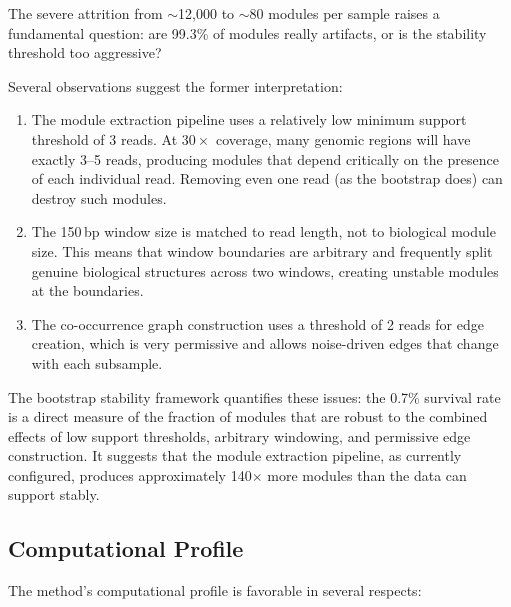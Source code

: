 \documentclass{../yalumba}
\begin{document}
The severe attrition from $\sim$12{,}000 to $\sim$80 modules per sample raises
a fundamental question: are 99.3\% of modules really artifacts, or is the
stability threshold too aggressive?

Several observations suggest the former interpretation:

\begin{enumerate}
  \item The module extraction pipeline uses a relatively low minimum support
    threshold of 3 reads.  At $30\times$ coverage, many genomic regions will
    have exactly 3--5 reads, producing modules that depend critically on the
    presence of each individual read.  Removing even one read (as the bootstrap
    does) can destroy such modules.
  \item The 150\,bp window size is matched to read length, not to biological
    module size.  This means that window boundaries are arbitrary and
    frequently split genuine biological structures across two windows, creating
    unstable modules at the boundaries.
  \item The co-occurrence graph construction uses a threshold of 2 reads for
    edge creation, which is very permissive and allows noise-driven edges that
    change with each subsample.
\end{enumerate}

The bootstrap stability framework quantifies these issues: the 0.7\% survival
rate is a direct measure of the fraction of modules that are robust to the
combined effects of low support thresholds, arbitrary windowing, and permissive
edge construction.  It suggests that the module extraction pipeline, as
currently configured, produces approximately 140$\times$ more modules than the
data can support stably.

\subsection{Computational Profile}

The method's computational profile is favorable in several respects:
\end{document}
